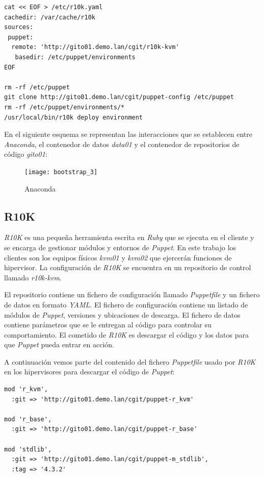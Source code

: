 \documentclass[a4paper,12pt,spanish,final]{epsc_tfc_pfc}
\begin{document}
\begin{lstlisting}[style=dnsmasq]
% post --log=/root/ks-post-chroot.log
cat << EOF > /etc/r10k.yaml
cachedir: /var/cache/r10k
sources:
 puppet:
  remote: 'http://gito01.demo.lan/cgit/r10k-kvm'
   basedir: /etc/puppet/environments
EOF

rm -rf /etc/puppet
git clone http://gito01.demo.lan/cgit/puppet-config /etc/puppet
rm -rf /etc/puppet/environments/*
/usr/local/bin/r10k deploy environment
\end{lstlisting}

En el siguiente esquema se representan las interacciones que se establecen entre \emph{Anaconda}, el contenedor de datos \emph{data01} y el contenedor de repositorios de código \emph{gito01}:

\begin{figure}[h]
  \centering
    \texttt{[image: bootstrap\_3]}
      \caption{Anaconda}
\end{figure}

\subsection{R10K}

\emph{R10K} es una pequeña herramienta escrita en \emph{Ruby} que se ejecuta en el cliente y se encarga de gestionar módulos y entornos de \emph{Puppet}. En este trabajo los clientes son los equipos físicos \emph{kvm01} y \emph{kvm02} que ejercerán funciones de hipervisor. La configuración de \emph{R10K} se encuentra en un repositorio de control llamado \emph{r10k-kvm}.

El repositorio contiene un fichero de configuración llamado \emph{Puppetfile} y un fichero de datos en formato \emph{YAML}. El fichero de configuración contiene un listado de módulos de \emph{Puppet}, versiones y ubicaciones de descarga. El fichero de datos contiene parámetros que se le entregan al código para controlar su comportamiento. El cometido de \emph{R10K} es descargar el código y los datos para que \emph{Puppet} pueda entrar en acción.

A continuación vemos parte del contenido del fichero \emph{Puppetfile} usado por \emph{R10K} en los hipervisores para descargar el código de \emph{Puppet}:\\

\begin{lstlisting}[style=dnsmasq]
mod 'r_kvm',
  :git => 'http://gito01.demo.lan/cgit/puppet-r_kvm'

mod 'r_base',
  :git => 'http://gito01.demo.lan/cgit/puppet-r_base'

mod 'stdlib',
  :git => 'http://gito01.demo.lan/cgit/puppet-m_stdlib',
  :tag => '4.3.2'
\end{lstlisting}
\end{document}
